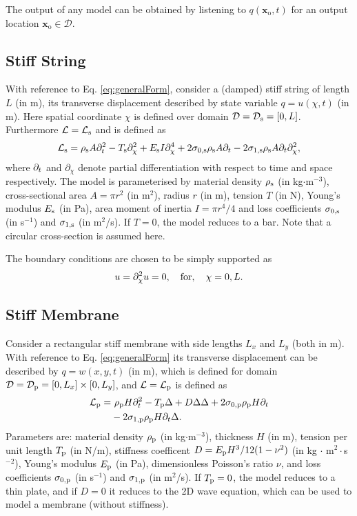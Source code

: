 \documentclass{article}
\begin{document}
The output of any model can be obtained by listening to $q(\boldsymbol{x}_\text{o}, t)$ for an output location $\boldsymbol{x}_\text{o} \in \mathcal{D}$. 

\subsection{Stiff String}
With reference to Eq. \eqref{eq:generalForm}, consider a (damped) stiff string of length $L$ (in m), its transverse displacement described by state variable $q = u(\chi, t)$ (in m). Here spatial coordinate $\chi$ is defined over domain $\mathcal{D} = \mathcal{D}_{\text{s}} = [0, L]$. Furthermore $\mathcal{L} = \mathcal{L}_{\text{s}}$ and is defined as \cite{Bensa2003}
\begin{equation}
    \mathcal{L}_\stxt = \rho_\stxt A\ptt - T_\stxt \pcc + E_\stxt I \pcccc + 2\szX[\stxt]\rho_\stxt A\pt - 2 \soX[\stxt]\rho_\stxt A\pt\pcc,
\end{equation}
where $\partial_t$ and $\partial_\chi$ denote partial differentiation with respect to time and space respectively. The model is parameterised by material density $\rho_{\text{s}}$ (in kg$\cdot$m$^{-3}$), cross-sectional area $A = \pi r^2$ (in m$^2$), radius $r$ (in m), tension $T$ (in N), Young's modulus $E_{\text{s}}$ (in Pa), area moment of inertia $I = \pi r^4/4$ and loss coefficients $\szX[\stxt]$ (in s$^{-1}$) and $\soX[\stxt]$ (in m$^2$/s). If $T=0$, the model reduces to a bar. Note that a circular cross-section is assumed here. 

The boundary conditions are chosen to be simply supported as
\begin{equation}
    u = \partial_{\chi}^2 u = 0, \quad \text{for}, \quad \chi = 0, L.
\end{equation}

\subsection{Stiff Membrane}
Consider a rectangular stiff membrane with side lengths $L_x$ and $L_y$ (both in m). With reference to Eq. \eqref{eq:generalForm} its transverse displacement can be described by $q = w(x, y, t)$ (in m), which is defined for domain
$\mathcal{D} = \mathcal{D}_{\text{p}} = [0, L_x] \times [0, L_y]$, and $\mathcal{L} = \mathcal{L}_{\text{p}}$ is defined as \cite{Fletcher1998}
\begin{equation}
    \begin{aligned}
        \mathcal{L}_\ptxt = &\ \rho_\ptxt H\ptt - T_\ptxt \Delta + D \Delta\Delta+ 2\szX[\ptxt]\rho_\ptxt H\pt \\
        & - 2 \soX[\ptxt]\rho_\ptxt H\pt\Delta.
    \end{aligned}
\end{equation}
Parameters are: material density $\rho_{\text{p}}$ (in kg$\cdot$m$^{-3}$), thickness $H$ (in m), tension per unit length $T_{\text{p}}$ (in N/m), stiffness coefficent $D = E_{\text{p}} H^3 / 12 (1-\nu^2)$ (in kg $\cdot$ m$^2\cdot$s$^{-2}$), Young's modulus $E_{\text{p}}$ (in Pa), dimensionless Poisson's ratio $\nu$, and loss coefficients $\szX[\ptxt]$ (in s$^{-1}$) and $\soX[\ptxt]$ (in m$^2$/s).
If $T_{\text{p}} = 0$, the model reduces to a thin plate, and if $D=0$ it reduces to the 2D wave equation, which can be used to model a membrane (without stiffness).
\end{document}
